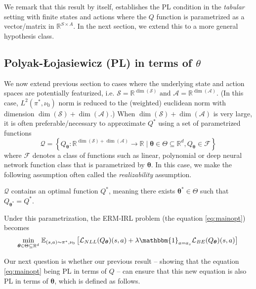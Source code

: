 \noindent We remark that this result by itself, establishes the PL condition in the \textit{tabular} setting with finite states and actions where the $Q$ function is parametrized as a vector/matrix in $\mathbb{R}^{S\times A}$. In the next section, we extend this to a more general hypothesis class.

\subsection{Polyak-Łojasiewicz (PL) in terms of $\theta$}
We now extend previous section to cases where the underlying state and action spaces are potentially featurized, i.e. $\mathcal{S}=\mathbb{R}^{\operatorname{dim}(\mathcal{S})} \text { and } \mathcal{A}=\mathbb{R}^{\operatorname{dim}(\mathcal{A})}$. (In this case, $L^2\left(\pi^*, \nu_0\right)$ norm is reduced to the (weighted) euclidean norm with dimension $\operatorname{dim}(\mathcal{S})+\operatorname{dim}(\mathcal{A})$.) When $\operatorname{dim}(\mathcal{S})+\operatorname{dim}(\mathcal{A})$ is very large, it is often preferable/necessary to approximate $Q^\ast$ using a set of parametrized functions 
$$\mathcal{Q}=\left\{Q_{\boldsymbol{\theta}}: \mathbb{R}^{\operatorname{dim}(\mathcal{S})+\operatorname{dim}(\mathcal{A})} \rightarrow \mathbb{R} \mid \boldsymbol{\theta} \in \Theta \subseteq \mathbb{R}^d, Q_{\boldsymbol{\theta}}\in\mathcal{F}\right\}$$
where $\mathcal{F}$ denotes a class of functions such as linear, polynomial or deep neural network function class that is parametrized by $\boldsymbol{\theta}$. In this case, we make the following assumption often called the \textit{realizability} assumption.

\begin{asmp}[Realizability]
\label{ass:realizability} 
    $\mathcal{Q}$ contains an optimal function $Q^*$, meaning there exists $\boldsymbol{\theta}^* \in \Theta$ such that $Q_{\boldsymbol{\theta}^*}=Q^*$.
\end{asmp}

\noindent Under this parametrization, the ERM-IRL problem (the equation \eqref{eq:mainopt}) becomes
\begin{align}
  \!\!\underset{\boldsymbol{\theta}\in \Theta \subseteq \mathbb{R}^d}{\min }  \;\mathbb{E}_{(s, a)\sim \pi^*, \nu_0}  \left[\mathcal{L}_{NLL}(Q_{\boldsymbol{\theta}})(s,a) + \lambda \mathbbm{1}_{a = a_s} \mathcal{L}_{BE}(Q_{\boldsymbol{\theta}})(s,a)\right] \! \notag
\end{align}

\noindent Our next question is whether our previous result -- showing that the equation \eqref{eq:mainopt} being PL in terms of $Q$ -- can ensure that this new equation is also PL in terms of $\boldsymbol{\theta}$, which is defined as follows.

